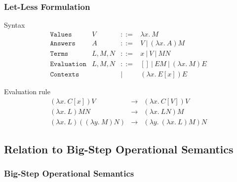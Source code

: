 \documentclass[dvipdfmx,cjk,xcolor=dvipsnames,envcountsect,notheorems,12pt]{beamer}
\theoremstyle{definition}
\begin{document}
\begin{frame}
	\frametitle{Let-Less Formulation}
	\Large
	Syntax
	{\normalsize \[\begin{array}{llcl}
		\texttt{Values} & V & ::= & \lambda x.~M \\
		\texttt{Answers} & A & ::= & V~|~(\lambda x.~A) M \\
		\texttt{Terms} & L, M, N & ::= & x~|~V~|~MN \\
		\texttt{Evaluation} & L, M, N & ::= & []~|~EM~|~(\lambda x.~M) E \\
		\texttt{Contexts} & & | & (\lambda x.~E[x])E
	\end{array}\]}

	Evaluation rule
	{\small \[\begin{array}{lcl}
		(\lambda x.~C[x]) V & \longrightarrow & (\lambda x.~C[V]) V \\
		(\lambda x.~L) M N & \longrightarrow & (\lambda x.~LN) M \\
		(\lambda x.~L) ((\lambda y.~M) N) & \longrightarrow & (\lambda y.~(\lambda x.~L)M)N
	\end{array}\]}
\end{frame}

\subsection{Relation to Big-Step Operational Semantics}

\begin{frame}
	\frametitle{Big-Step Operational Semantics}
	\Large
\end{frame}
\end{document}
